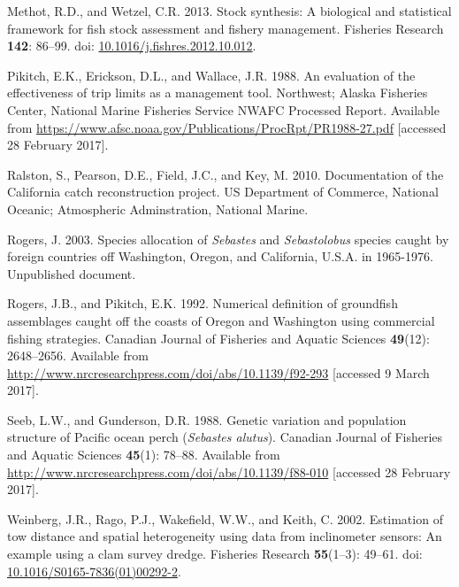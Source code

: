 \documentclass[12pt,]{article}
\begin{document}
\hypertarget{ref-methot_stock_2013}{}
Methot, R.D., and Wetzel, C.R. 2013. Stock synthesis: A biological and
statistical framework for fish stock assessment and fishery management.
Fisheries Research \textbf{142}: 86--99. doi:
\href{https://doi.org/10.1016/j.fishres.2012.10.012}{10.1016/j.fishres.2012.10.012}.

\hypertarget{ref-pikitch_evaluation_1988}{}
Pikitch, E.K., Erickson, D.L., and Wallace, J.R. 1988. An evaluation of
the effectiveness of trip limits as a management tool. Northwest; Alaska
Fisheries Center, National Marine Fisheries Service NWAFC Processed
Report. Available from
\url{https://www.afsc.noaa.gov/Publications/ProcRpt/PR1988-27.pdf}
{[}accessed 28 February 2017{]}.

\hypertarget{ref-ralston_documentation_2010}{}
Ralston, S., Pearson, D.E., Field, J.C., and Key, M. 2010. Documentation
of the California catch reconstruction project. US Department of
Commerce, National Oceanic; Atmospheric Adminstration, National Marine.

\hypertarget{ref-rogers_species_2003}{}
Rogers, J. 2003. Species allocation of \emph{Sebastes} and
\emph{Sebastolobus} species caught by foreign countries off Washington,
Oregon, and California, U.S.A. in 1965-1976. Unpublished document.

\hypertarget{ref-rogers_numerical_1992}{}
Rogers, J.B., and Pikitch, E.K. 1992. Numerical definition of groundfish
assemblages caught off the coasts of Oregon and Washington using
commercial fishing strategies. Canadian Journal of Fisheries and Aquatic
Sciences \textbf{49}(12): 2648--2656. Available from
\url{http://www.nrcresearchpress.com/doi/abs/10.1139/f92-293}
{[}accessed 9 March 2017{]}.

\hypertarget{ref-seeb_genetic_1988}{}
Seeb, L.W., and Gunderson, D.R. 1988. Genetic variation and population
structure of Pacific ocean perch (\emph{Sebastes alutus}). Canadian
Journal of Fisheries and Aquatic Sciences \textbf{45}(1): 78--88.
Available from
\url{http://www.nrcresearchpress.com/doi/abs/10.1139/f88-010}
{[}accessed 28 February 2017{]}.

\hypertarget{ref-weinberg_estimation_2002}{}
Weinberg, J.R., Rago, P.J., Wakefield, W.W., and Keith, C. 2002.
Estimation of tow distance and spatial heterogeneity using data from
inclinometer sensors: An example using a clam survey dredge. Fisheries
Research \textbf{55}(1--3): 49--61. doi:
\href{https://doi.org/10.1016/S0165-7836(01)00292-2}{10.1016/S0165-7836(01)00292-2}.
\end{document}
